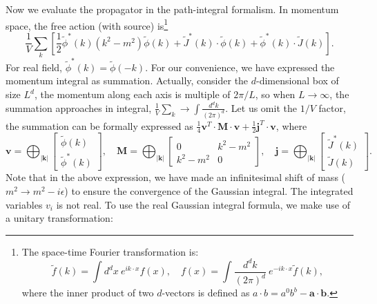 \documentclass[aps,prb,superscriptaddress,nofootinbib]{revtex4}
\begin{document}
Now we evaluate the propagator in the path-integral formalism.
In momentum space, the free action (with source) is\footnote{The space-time Fourier transformation is: 
\begin{equation*}
	\tilde{f}(k) = \int d^{d}x\ e^{ik\cdot x} f(x),\quad
	f(x) = \int \frac{d^{d}k}{(2\pi)^{d}}\ e^{-ik\cdot x}\tilde{f}(k),
\end{equation*}
where the inner product of two $d$-vectors is defined as $a \cdot b = a^0 b^b - \bm a \cdot \bm b$.}
\begin{equation*}
	\frac{1}{V}\sum_k \left[\frac{1}{2}\tilde\phi^*(k)( k^2-m^2)\tilde\phi(k)+\tilde J^*(k)\cdot\tilde\phi(k)+\tilde\phi^*(k)\cdot\tilde J(k)\right].
\end{equation*}
For real field, $\tilde\phi^*(k) = \tilde\phi(-k)$.
For our convenience, we have expressed the momentum integral as summation.
Actually, consider the $d$-dimensional box of size $L^d$, the momentum along each axis is multiple of $2\pi/L$, so when $L\rightarrow \infty$, the summation approaches in integral, $\frac{1}{V}\sum_k \rightarrow \int \frac{d^d k}{(2\pi)^d}$.
Let us omit the $1/V$ factor, the summation can be formally expressed as $\frac{1}{4}\mathbf{v}^T \cdot \mathbf M\cdot \mathbf{v} + \frac{1}{2}\mathbf{j}^T \cdot \mathbf{v}$, where
\begin{equation*}
	\mathbf v = \bigoplus_{|\mathbf k|} \left[
	\begin{array}{c}
		\tilde{\phi}(k) \\ 
		\tilde{\phi}^*(k) 
	\end{array}\right], \quad
	\mathbf M = \bigoplus_{|\mathbf k|} \left[
	\begin{array}{cc} 
		0 & k^2-m^2 \\ 
		k^2-m^2 & 0 
	\end{array}\right], \quad
	\mathbf j = \bigoplus_{|\mathbf k|} \left[
	\begin{array}{c}
		\tilde{J}^*(k) \\ 
		\tilde{J}(k) 
	\end{array}\right].
\end{equation*}
Note that in the above expression, we have made an infinitesimal shift of mass ($m^2 \rightarrow m^2 - i\epsilon$) to ensure the convergence of the Gaussian integral.
The integrated variables $v_i$ is not real.
To use the real Gaussian integral formula, we make use of a unitary transformation: 
\end{document}
